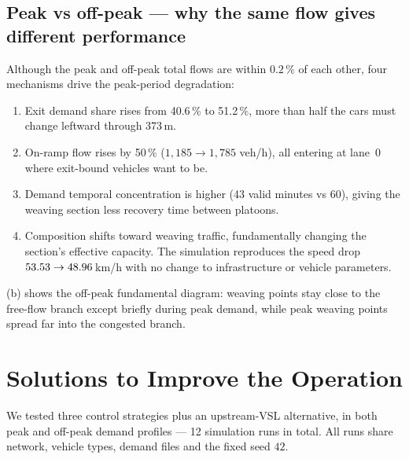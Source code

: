 \documentclass[11pt,a4paper]{article}
\begin{document}
\subsection{Peak vs off-peak --- why the same flow gives different performance}
Although the peak and off-peak total flows are within $0.2\,\%$ of each other, four mechanisms drive the peak-period degradation:
\begin{enumerate}[topsep=2pt,itemsep=1pt]
\item Exit demand share rises from 40.6\,\% to 51.2\,\%, more than half the cars must change leftward through 373\,m.
\item On-ramp flow rises by 50\,\% ($1{,}185 \to 1{,}785$ veh/h), all entering at lane~0 where exit-bound vehicles want to be.
\item Demand temporal concentration is higher (43 valid minutes vs 60), giving the weaving section less recovery time between platoons.
\item Composition shifts toward weaving traffic, fundamentally changing the section's effective capacity. The simulation reproduces the speed drop $53.53 \to 48.96$\,km/h with no change to infrastructure or vehicle parameters.
\end{enumerate}

 (b) shows the off-peak fundamental diagram: weaving points stay close to the free-flow branch except briefly during peak demand, while peak weaving points spread far into the congested branch.

\section{Solutions to Improve the Operation}
\label{sec:solutions}

We tested three control strategies plus an upstream-VSL alternative, in both peak and off-peak demand profiles --- 12 simulation runs in total. All runs share network, vehicle types, demand files and the fixed seed $42$.
\end{document}

